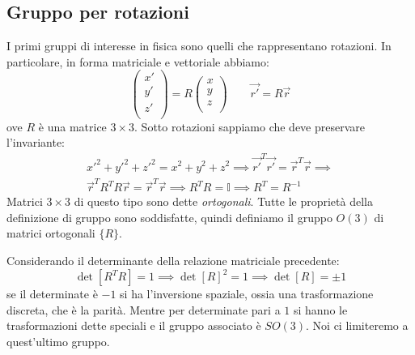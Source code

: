 \subsection{Gruppo per rotazioni}
I primi gruppi di interesse in fisica sono quelli che rappresentano rotazioni. In particolare, in forma matriciale e vettoriale abbiamo:
\begin{equation}
\begin{pmatrix}
x'   \\
y'   \\
 z'  \\
\end{pmatrix}
=R\begin{pmatrix}
x \\
y   \\
 z  \\
\end{pmatrix}\qquad
\Vec{r'}=R\Vec{r}
\end{equation}
ove $R$ è una matrice $3\times3$. Sotto rotazioni sappiamo che deve preservare l'invariante:
\begin{equation}
\begin{gathered}
    x'^2+y'^2+z'^2=x^2+y^2+z^2 \implies \Vec{r'}^T\Vec{r'}=\Vec{r}^T\Vec{r}\implies\\
    \Vec{r}^TR^TR\Vec{r}=\Vec{r}^T\Vec{r}\implies R^TR=\mathds{I}\implies R^T=R^{-1}
\end{gathered}
\end{equation}
Matrici $3\times3$ di questo tipo sono dette \textit{ortogonali}. Tutte le proprietà della definizione di gruppo sono soddisfatte, quindi definiamo il gruppo $O(3)$ di matrici ortogonali $\{R\}$.

Considerando il determinante della relazione matriciale precedente:
\begin{equation}   \det\left[R^TR\right]=1\implies \det\left[R\right]^2=1 \implies \det\left[R\right]=\pm1
\end{equation}
se il determinate è $-1$ si ha l'inversione spaziale, ossia una trasformazione discreta, che è la parità. Mentre per determinate pari a $1$ si hanno le trasformazioni dette speciali e il gruppo associato è $SO(3)$.
Noi ci limiteremo a quest'ultimo gruppo.

